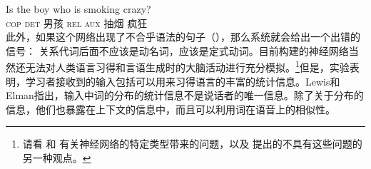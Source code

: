 \ea
\gll Is the boy who is smoking crazy?\\
\textsc{cop} \textsc{det} 男孩 \textsc{rel} \textsc{aux} 抽烟 疯狂\\
\z
此外，如果这个网络出现了不合乎语法的句子（），那么系统就会给出一个出错的信号：
\z
关系代词后面不应该是动名词，应该是定式动词。目前构建的神经网络当然还无法对人类语言习得和言语生成时的大脑活动进行充分模拟。\footnote{%
请看 \citet[]{Hurford2002a}和 \citet[\S~6.2]{Jackendoff2007a}有关神经网络的特定类型带来的问题，以及 \citet{Pulvermueller2003a,Pulvermueller2010a}提出的不具有这些问题的另一种观点。
}但是，实验表明，学习者接收到的输入包括可以用来习得语言的丰富的统计信息。Lewis和Elman指出，输入中词的分布的统计信息不是说话者的唯一信息。除了关于分布的信息，他们也暴露在上下文的信息中，而且可以利用词在语音上的相似性。
